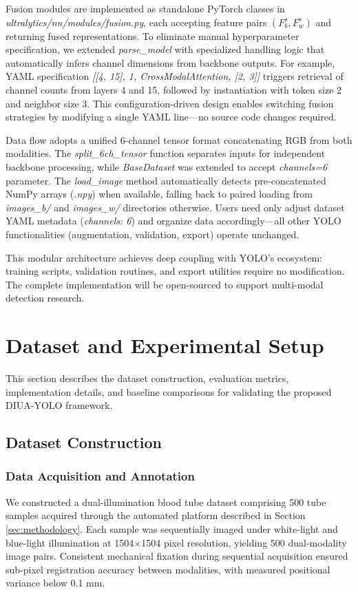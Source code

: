 \documentclass[journal,twoside,web]{ieeecolor}
\begin{document}
Fusion modules are implemented as standalone PyTorch classes in \textit{ultralytics/nn/modules/fusion.py}, each accepting feature pairs $(F_b^s, F_w^s)$ and returning fused representations. To eliminate manual hyperparameter specification, we extended \textit{parse\_model} with specialized handling logic that automatically infers channel dimensions from backbone outputs. For example, YAML specification \textit{[[4, 15], 1, CrossModalAttention, [2, 3]]} triggers retrieval of channel counts from layers 4 and 15, followed by instantiation with token size 2 and neighbor size 3. This configuration-driven design enables switching fusion strategies by modifying a single YAML line—no source code changes required.

Data flow adopts a unified 6-channel tensor format concatenating RGB from both modalities. The \textit{split\_6ch\_tensor} function separates inputs for independent backbone processing, while \textit{BaseDataset} was extended to accept \textit{channels=6} parameter. The \textit{load\_image} method automatically detects pre-concatenated NumPy arrays (\textit{.npy}) when available, falling back to paired loading from \textit{images\_b/} and \textit{images\_w/} directories otherwise. Users need only adjust dataset YAML metadata (\textit{channels: 6}) and organize data accordingly—all other YOLO functionalities (augmentation, validation, export) operate unchanged.

This modular architecture achieves deep coupling with YOLO's ecosystem: training scripts, validation routines, and export utilities require no modification. The complete implementation will be open-sourced to support multi-modal detection research.


\section{Dataset and Experimental Setup}
\label{sec:experiments}

This section describes the dataset construction, evaluation metrics, implementation details, and baseline comparisons for validating the proposed DIUA-YOLO framework.

\subsection{Dataset Construction}

\subsubsection{Data Acquisition and Annotation} We constructed a dual-illumination blood tube dataset comprising 500 tube samples acquired through the automated platform described in Section \ref{sec:methodology}. Each sample was sequentially imaged under white-light and blue-light illumination at 1504$\times$1504 pixel resolution, yielding 500 dual-modality image pairs. Consistent mechanical fixation during sequential acquisition ensured sub-pixel registration accuracy between modalities, with measured positional variance below 0.1 mm.
\end{document}

